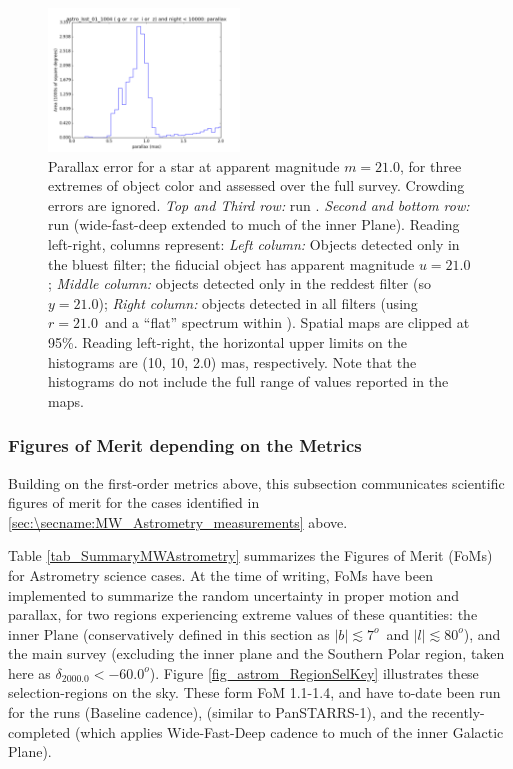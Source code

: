 \begin{figure}[ht]
\begin{center}
  \includegraphics[width=2.0in]{./figs/milkyway/astromPanels/MW_Astrom_paError_wfdPlane_10y_hst.png}
  \end{center}
  \caption{Parallax error for a star at apparent magnitude $m=21.0$, for three extremes of object color and assessed over the full survey. Crowding errors are ignored. {\it Top and Third row:} \OpSim run . {\it Second and bottom row:} \OpSim run  (wide-fast-deep extended to much of the inner Plane). Reading left-right, columns represent: {\it Left column:} Objects detected only in the bluest filter; the fiducial object has apparent magnitude $u=21.0$; {\it Middle column:} objects detected only in the reddest filter (so $y = 21.0$); {\it Right column:} objects detected in all filters (using $r=21.0$~and a ``flat'' spectrum within \MAF). Spatial maps are clipped at 95\%. Reading left-right, the horizontal upper limits on the histograms are (10, 10, 2.0) mas, respectively. Note that the histograms do not include the full range of values reported in the maps.}
  \label{fig_astrom_ByFilter_paError}
\end{figure}

\subsubsection{Figures of Merit depending on the Metrics}

Building on the first-order metrics above, this subsection communicates scientific figures of merit for the cases identified in \autoref{sec:\secname:MW_Astrometry_measurements} above.

Table \ref{tab_SummaryMWAstrometry} summarizes the Figures of Merit
(FoMs) for Astrometry science cases. At the time of writing, FoMs have
been implemented to summarize the random uncertainty in proper motion
and parallax, for two regions experiencing extreme values of these
quantities: the inner Plane (conservatively defined in this section as
$|b| \lesssim 7^o$~and $|l| \lesssim 80^o$), and the main survey
(excluding the inner plane and the Southern Polar region, taken
here as $\delta_{2000.0} < -60.0^o$). Figure
\ref{fig_astrom_RegionSelKey} illustrates these selection-regions on
the sky. These form FoM 1.1-1.4, and have to-date been run for the
\OpSim runs  (Baseline cadence),
 (similar to PanSTARRS-1), and the
recently-completed  (which applies
Wide-Fast-Deep cadence to much of the inner Galactic Plane).

